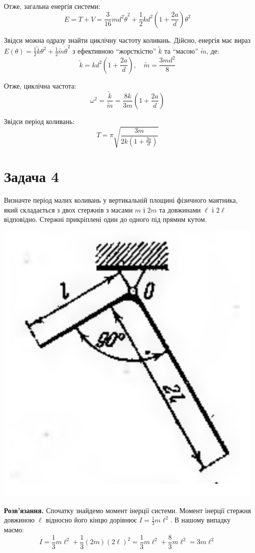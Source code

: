 \documentclass{hw_template}
\begin{document}
Отже, загальна енергія системи:
\begin{equation*}
    E = T + V = \frac{3}{16}md^2\dot{\theta}^2 + \frac{1}{2}k d^2\left(1+\frac{2a}{d}\right)\theta^2
\end{equation*}

Звідси можна одразу знайти циклічну частоту коливань. Дійсно, енергія має вираз
$E(\theta) =
\frac{1}{2}\widetilde{k}\theta^2+\frac{1}{2}\widetilde{m}\dot{\theta}^2$ з
ефективною ``жорсткістю'' $\widetilde{k}$ та ``масою'' $\widetilde{m}$, де:
\begin{equation*}
    \widetilde{k} = k d^2 \left(1+\frac{2a}{d}\right), \quad \widetilde{m} = \frac{3md^2}{8}
\end{equation*}

Отже, циклічна частота:
\begin{equation*}
    \omega^2 = \frac{\widetilde{k}}{\widetilde{m}} = \frac{8k}{3m}\left(1+\frac{2a}{d}\right)
\end{equation*}

Звідси період коливань:
\begin{equation*}
    T = \pi\sqrt{\frac{3m}{2k\left(1+\frac{2a}{d}\right)}}
\end{equation*}

\newpage
\section{Задача 4}
\begin{problem}
    Визначте період малих коливань у вертикальній площині фізичного маятника,
який складається з двох стержнів з масами $m$ і $2m$ та довжинами $\ell$ і
$2\ell$ відповідно. Стержні прикріплені один до одного під прямим кутом.
\end{problem}

\begin{center}
    \includegraphics[width=0.3\linewidth]{images/hw_3_problem_4.png}
\end{center}

\textbf{Розв'язання.} Спочатку знайдемо момент інерції системи. Момент інерції
стержня довжиною $\ell$ відносно його кінцю дорівнює $I = \frac{1}{3}m\ell^2$.
В нашому випадку маємо:
\begin{equation*}
    I = \frac{1}{3}m\ell^2 + \frac{1}{3}(2m)(2\ell)^2 = \frac{1}{3}m\ell^2 + \frac{8}{3}m\ell^2 = 3m\ell^2
\end{equation*}
\end{document}
